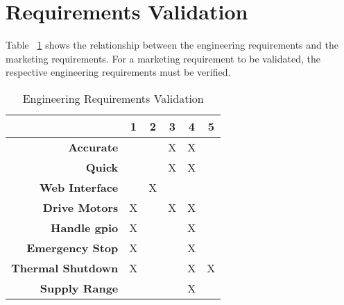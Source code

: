 \section{Requirements Validation}
Table ~\ref{table:validation} shows the relationship between the engineering requirements and the marketing requirements.
For a marketing requirement to be validated, the respective engineering requirements must be verified.

\begin{table}[H]
	\caption{Engineering Requirements Validation}
	\label{table:validation}
	\centering
	\begin{tabular}{|r |c |c |c |c |c|} 
		\hline\hline
		&1&2&3&4&5\\
		\hline
		\textbf{Accurate} &  & & X & X & \\
		\hline
		\textbf{Quick} &  & & X & X & \\
		\hline
		\textbf{Web Interface} & & X & & & \\
		\hline
		\textbf{Drive Motors} & X & & X & X & \\
		\hline
		\textbf{Handle \gls{gpio}} & X & & & X & \\
		\hline
		\textbf{Emergency Stop} & X & & & X & \\
		\hline
		\textbf{Thermal Shutdown } & X & & & X & X \\
		\hline
		\textbf{Supply Range} & & & & X & \\
	\hline 
	\end{tabular}
\end{table}
